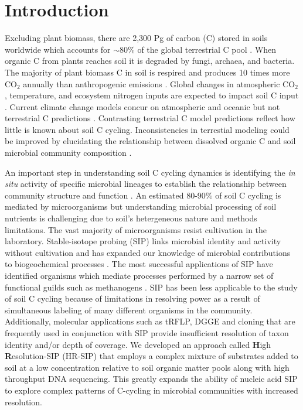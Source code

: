 \section{Introduction}
Excluding plant biomass, there are 2,300 Pg of carbon (C) stored in soils
worldwide which accounts for $\sim$80\% of the global terrestrial C pool
\citep{Amundson_2001,BATJES_1996}. When organic C from plants reaches soil it
is degraded by fungi, archaea, and bacteria.  The majority of plant biomass
C in soil is respired and produces 10 times more CO$_{2}$ annually than
anthropogenic emissions \citep{chapin2002principles}. Global
changes in atmospheric CO$_{2}$, temperature, and ecosystem nitrogen inputs are
expected to impact soil C input \citep{Groenigen_2006}. Current climate change
models concur on atmospheric and oceanic but not terrestrial C predictions
\citep{Friedlingstein_2006}. Contrasting terrestrial C model predictions
reflect how little is known about soil C cycling. Inconsistencies in
terrestial modeling could be improved by elucidating the relationship between
dissolved organic C and soil microbial community composition \citep{Neff_2001}.


An important step in understanding soil C cycling dynamics is identifying the
\textit{in situ} activity of specific microbial lineages to establish the
relationship between community structure and function \citep{O_Donnell_2002}.
An estimated 80-90\% of soil C cycling is mediated by microorganisms
\citep{ColemanCrossley_1996,Nannipieri_2003} but understanding microbial
processing of soil nutrients is challenging due to soil's hetergeneous nature
and methods limitations. The vast majority of microorganisms resist cultivation
in the laboratory. Stable-isotope probing (SIP) links microbial identity and
activity without cultivation and has expanded our knowledge of microbial
contributions to biogeochemical processes \citep{Chen_Murrell_2010}. The most
successful applications of SIP have identified organisms which mediate
processes performed by a narrow set of functional guilds such as methanogens
\citep{Lu_2005}. SIP has been less applicable to the study of soil C cycling
because of limitations in resolving power as a result of simultaneous labeling
of many different organisms in the community. Additionally, molecular
applications such as tRFLP, DGGE and cloning that are frequently used in
conjunction with SIP provide insufficient resolution of taxon identity and/or
depth of coverage. We developed an approach called \textbf{H}igh
\textbf{R}esolution-SIP (HR-SIP) that employs a complex mixture of substrates
added to soil at a low concentration relative to soil organic matter pools
along with high throughput DNA sequencing. This greatly expands the ability of
nucleic acid SIP to explore complex patterns of C-cycling in microbial
communities with increased resolution.

